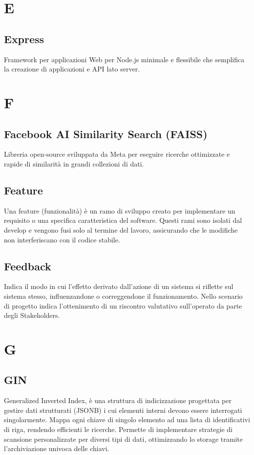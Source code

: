\documentclass[10pt, letterpaper]{article}
\begin{document}
\section{E}

\subsection*{Express}
Framework per applicazioni Web per Node.js minimale e flessibile che semplifica la creazione di applicazioni e API lato server.

\section{F}

\subsection*{Facebook AI Similarity Search (FAISS)}
Libreria open-source sviluppata da Meta per eseguire ricerche ottimizzate e rapide di similarità in grandi collezioni di dati.

\subsection*{Feature}
Una feature (funzionalità) è un ramo di sviluppo creato per implementare un requisito o una specifica caratteristica del software. Questi rami sono isolati dal
develop e vengono fusi solo al termine del lavoro, assicurando che le modifiche non interferiscano con il codice stabile.

\subsection*{Feedback}
Indica il modo in cui l'effetto derivato dall'azione di un sistema si riflette sul sistema stesso, influenzandone o correggendone il funzionamento. Nello
scenario di progetto indica l'ottenimento di un riscontro valutativo sull'operato da parte degli Stakeholders.

\section{G}

\subsection*{GIN}
Generalized Inverted Index, è una struttura di indicizzazione progettata per gestire dati strutturati (JSONB) i cui elementi interni devono essere interrogati singolarmente. Mappa ogni chiave di singolo elemento ad una lista di identificativi di riga, rendendo efficienti le ricerche. Permette di implementare strategie di scansione personalizzate per diversi tipi di dati, ottimizzando lo storage tramite l'archiviazione univoca delle chiavi.
\end{document}

